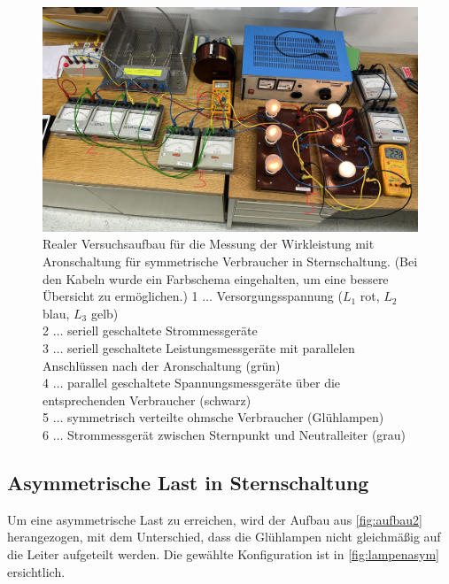 \documentclass[12pt,english,ngerman]{scrartcl}
\begin{document}
\begin{figure}[H]
	\begin{center}
		\includegraphics[width = \textwidth]{./figures/aufbau2_echt.png}
	\end{center}
	\caption[Realer Versuchsaufbau für die Messung der Wirkleistung mit Aronschaltung für symmetrische
	Verbraucher in Sternschaltung]
	{Realer Versuchsaufbau für die Messung der Wirkleistung mit Aronschaltung für symmetrische
	Verbraucher in Sternschaltung. (Bei den Kabeln wurde ein Farbschema eingehalten, um eine bessere Übersicht zu ermöglichen.) 
	1 \(\dots\) Versorgungsspannung ($L_1$ rot, $L_2$ blau, $L_3$ gelb) \\
	2 \(\dots\) seriell geschaltete Strommessgeräte  \\
	3 \(\dots\) seriell geschaltete Leistungsmessgeräte mit parallelen Anschlüssen nach der Aronschaltung (grün)\\
	4 \(\dots\) parallel geschaltete Spannungsmessgeräte über die entsprechenden Verbraucher (schwarz)\\
	5 \(\dots\) symmetrisch verteilte ohmsche Verbraucher (Glühlampen) \\
	6 \(\dots\) Strommessgerät zwischen Sternpunkt und Neutralleiter (grau)}\label{fig:aufbau2_echt}
\end{figure}


\subsection{Asymmetrische Last in Sternschaltung}

Um eine asymmetrische Last zu erreichen, wird der Aufbau aus \autoref{fig:aufbau2} herangezogen, mit dem Unterschied, 
dass die Glühlampen nicht gleichmäßig auf die Leiter aufgeteilt werden. Die gewählte Konfiguration ist in \autoref{fig:lampenasym} ersichtlich.
\end{document}
